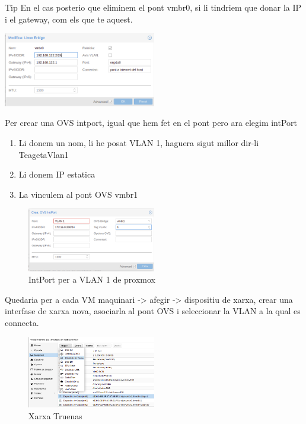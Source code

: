 \documentclass[
  10pt,
]{krantz}
\providecommand{\tightlist}{%
  \setlength{\itemsep}{0pt}\setlength{\parskip}{0pt}}
\begin{document}
\begin{rmdtip}{Tip}
En el cas posterio que eliminem el pont vmbr0, si li tindriem que donar la IP i el gateway, com els que te aquest.

\includegraphics[width=0.5\textwidth,height=\textheight]{imatges/proxmox/vmBr0.png}

\end{rmdtip}

Per crear una OVS intport, igual que hem fet en el pont pero ara elegim intPort

\begin{enumerate}
\def\labelenumi{\arabic{enumi}.}
\tightlist
\item
  Li donem un nom, li he posat VLAN 1, haguera sigut millor dir-li TeagetaVlan1
\item
  Li donem IP estatica
\item
  La vinculem al pont OVS vmbr1
\end{enumerate}

\begin{figure}
\centering
\includegraphics[width=0.5\textwidth,height=\textheight]{imatges/proxmox/Intport_VLAN1.png}
\caption{IntPort per a VLAN 1 de proxmox}
\end{figure}

Quedaria per a cada VM maquinari -\textgreater{} afegir -\textgreater{} dispositiu de xarxa, crear una interfase de xarxa nova, asociarla al pont OVS i seleccionar la VLAN a la qual es connecta.

\begin{figure}
\centering
\includegraphics[width=0.5\textwidth,height=\textheight]{imatges/proxmox/truenas_xarxa3.png}
\caption{Xarxa Truenas}
\end{figure}
\end{document}
